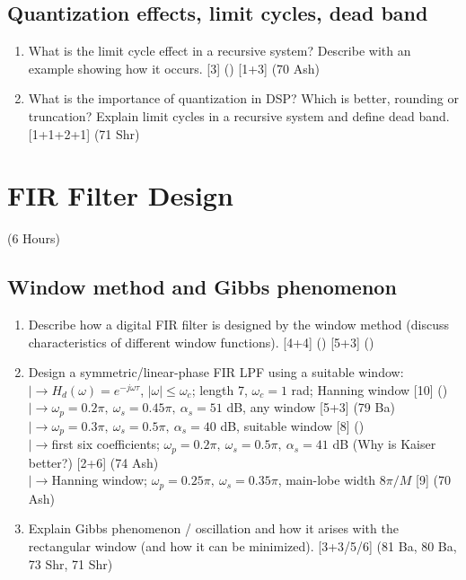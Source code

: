 \documentclass[12pt]{article}
\newcommand{\lb}{\\$\left|\rightarrow\right.$}
\begin{document}
  \subsection{Quantization effects, limit cycles, dead band}
    \begin{enumerate}[topsep=0pt, noitemsep]
      \item What is the limit cycle effect in a recursive system? Describe with an example showing how it occurs. \hfill [3] () [1+3] (70 Ash)
      \item What is the importance of quantization in DSP? Which is better, rounding or truncation? Explain limit cycles in a recursive system and define dead band. \hfill [1+1+2+1] (71 Shr)
    \end{enumerate}

\pagebreak
\section{FIR Filter Design}
\begin{center}(6 Hours)\end{center}

  \subsection{Window method and Gibbs phenomenon}
    \begin{enumerate}[topsep=0pt, noitemsep]
      \item Describe how a digital FIR filter is designed by the window method (discuss characteristics of different window functions). \hfill [4+4] () [5+3] ()
      \item Design a symmetric/linear-phase FIR LPF using a suitable window:
        \lb $H_d(\omega)=e^{-j\omega\tau}$, $|\omega|\le\omega_c$; length 7, $\omega_c=1$ rad; Hanning window \hfill [10] ()
        \lb $\omega_p=0.2\pi,\ \omega_s=0.45\pi,\ \alpha_s=51$ dB, any window \hfill [5+3] (79 Ba)
        \lb $\omega_p=0.3\pi,\ \omega_s=0.5\pi,\ \alpha_s=40$ dB, suitable window \hfill [8] ()
        \lb first six coefficients; $\omega_p=0.2\pi,\ \omega_s=0.5\pi,\ \alpha_s=41$ dB (Why is Kaiser better?) \hfill [2+6] (74 Ash)
        \lb Hanning window; $\omega_p=0.25\pi,\ \omega_s=0.35\pi$, main-lobe width $8\pi/M$ \hfill [9] (70 Ash)
      \item Explain Gibbs phenomenon / oscillation and how it arises with the rectangular window (and how it can be minimized). \hfill [3+3/5/6] (81 Ba, 80 Ba, 73 Shr, 71 Shr)
    \end{enumerate}
\end{document}
